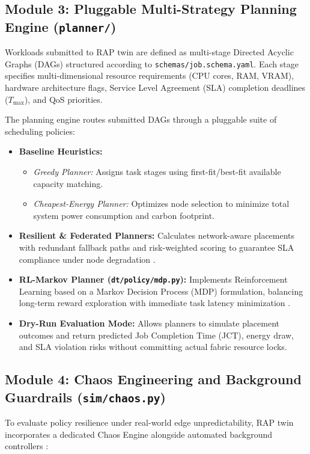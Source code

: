 \documentclass[twoside,twocolumn,10pt]{article}
\begin{document}
\subsection{Module 3: Pluggable Multi-Strategy Planning Engine (\texttt{planner/})}
Workloads submitted to RAP twin are defined as multi-stage Directed Acyclic Graphs (DAGs) structured according to \texttt{schemas/job.schema.yaml}. Each stage specifies multi-dimensional resource requirements (CPU cores, RAM, VRAM), hardware architecture flags, Service Level Agreement (SLA) completion deadlines ($T_{\max}$), and QoS priorities.

The planning engine routes submitted DAGs through a pluggable suite of scheduling policies:
\begin{itemize}
    \item \textbf{Baseline Heuristics:} 
    \begin{itemize}
        \item \textit{Greedy Planner:} Assigns task stages using first-fit/best-fit available capacity matching.
        \item \textit{Cheapest-Energy Planner:} Optimizes node selection to minimize total system power consumption and carbon footprint.
    \end{itemize}
    \item \textbf{Resilient \& Federated Planners:} Calculates network-aware placements with redundant fallback paths and risk-weighted scoring to guarantee SLA compliance under node degradation \cite{dai2024}.
    \item \textbf{RL-Markov Planner (\texttt{dt/policy/mdp.py}):} Implements Reinforcement Learning based on a Markov Decision Process (MDP) formulation, balancing long-term reward exploration with immediate task latency minimization \cite{dai2024}.
    \item \textbf{Dry-Run Evaluation Mode:} Allows planners to simulate placement outcomes and return predicted Job Completion Time (JCT), energy draw, and SLA violation risks without committing actual fabric resource locks.
\end{itemize}

\subsection{Module 4: Chaos Engineering and Background Guardrails (\texttt{sim/chaos.py})}
To evaluate policy resilience under real-world edge unpredictability, RAP twin incorporates a dedicated Chaos Engine alongside automated background controllers \cite{esen2026}:
\end{document}
